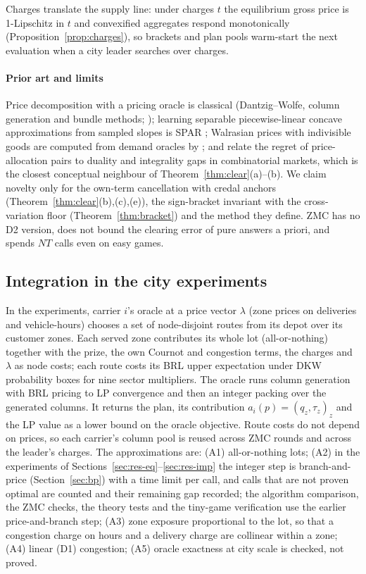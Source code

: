 \documentclass[preprint,12pt]{elsarticle}
\theoremstyle{definition}
\theoremstyle{remark}
\begin{document}
Charges translate the supply line: under charges $t$ the equilibrium gross price is 1-Lipschitz in $t$ and convexified aggregates respond monotonically (Proposition~\ref{prop:charges}), so brackets and plan pools warm-start the next evaluation when a city leader searches over charges.

\paragraph{Prior art and limits} Price decomposition with a pricing oracle is classical (Dantzig--Wolfe, column generation and bundle methods; \citealp{Briant2008}); learning separable piecewise-linear concave approximations from sampled slopes is SPAR \citep{Powell2004}; Walrasian prices with indivisible goods are computed from demand oracles by \citet{PaesLeme2020}; and \citet{Duguet2025} relate the regret of price-allocation pairs to duality and integrality gaps in combinatorial markets, which is the closest conceptual neighbour of Theorem~\ref{thm:clear}(a)--(b). We claim novelty only for the own-term cancellation with credal anchors (Theorem~\ref{thm:clear}(b),(c),(e)), the sign-bracket invariant with the cross-variation floor (Theorem~\ref{thm:bracket}) and the method they define. ZMC has no D2 version, does not bound the clearing error of pure answers a priori, and spends $NT$ calls even on easy games.

\subsection{Integration in the city experiments}\label{sec:integration}

In the experiments, carrier $i$'s oracle at a price vector $\lambda$ (zone prices on deliveries and vehicle-hours) chooses a set of node-disjoint routes from its depot over its customer zones. Each served zone contributes its whole lot (all-or-nothing) together with the prize, the own Cournot and congestion terms, the charges and $\lambda$ as node costs; each route costs its BRL upper expectation under DKW probability boxes for nine sector multipliers. The oracle runs column generation with BRL pricing to LP convergence and then an integer packing over the generated columns. It returns the plan, its contribution $a_i(p)=(q_z,\tau_z)_z$ and the LP value as a lower bound on the oracle objective. Route costs do not depend on prices, so each carrier's column pool is reused across ZMC rounds and across the leader's charges. The approximations are: (A1) all-or-nothing lots; (A2) in the experiments of Sections~\ref{sec:res-eq}--\ref{sec:res-imp} the integer step is branch-and-price (Section~\ref{sec:bp}) with a time limit per call, and calls that are not proven optimal are counted and their remaining gap recorded; the algorithm comparison, the ZMC checks, the theory tests and the tiny-game verification use the earlier price-and-branch step; (A3) zone exposure proportional to the lot, so that a congestion charge on hours and a delivery charge are collinear within a zone; (A4) linear (D1) congestion; (A5) oracle exactness at city scale is checked, not proved.
\end{document}
